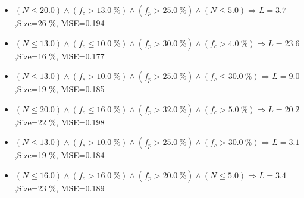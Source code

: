\documentclass[numbered]{CSL}
\begin{document}
\begin{itemize}
\item $(N \leq 20.0) \land (f_c > 13.0~\%) \land (f_p > 25.0~\%) \land (N \leq 5.0) \Rightarrow L = 3.7$,\hfill Size=26 \%, MSE=0.194
\item $(N \leq 13.0) \land (f_c \leq 10.0~\%) \land (f_p > 30.0~\%) \land (f_c > 4.0~\%) \Rightarrow L = 23.6$,\hfill Size=16 \%, MSE=0.177
\item $(N \leq 13.0) \land (f_c > 10.0~\%) \land (f_p > 25.0~\%) \land (f_c \leq 30.0~\%) \Rightarrow L = 9.0$,\hfill Size=19 \%, MSE=0.185
\item $(N \leq 20.0) \land (f_c \leq 16.0~\%) \land (f_p > 32.0~\%) \land (f_c > 5.0~\%) \Rightarrow L = 20.2$,\hfill Size=22 \%, MSE=0.198
\item $(N \leq 13.0) \land (f_c > 10.0~\%) \land (f_p > 25.0~\%) \land (f_c > 30.0~\%) \Rightarrow L = 3.1$,\hfill Size=19 \%, MSE=0.184
\item $(N \leq 16.0) \land (f_c > 16.0~\%) \land (f_p > 20.0~\%) \land (N \leq 5.0) \Rightarrow L = 3.4$,\hfill Size=23 \%, MSE=0.189
\end{itemize}
\end{document}
